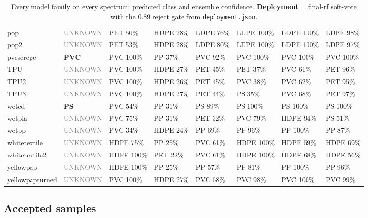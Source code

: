 \documentclass[11pt,a4paper]{article}
\newcommand{\unk}{\textcolor{gray}{UNKNOWN}}
\begin{document}
\begin{table}[p]
\begin{tabular}{llllllll}
pop               & \unk & PET 50\%  & HDPE 28\%& LDPE 76\%& LDPE 100\%& LDPE 100\%& LDPE 98\% \\
pop2              & \unk & PET 53\%  & HDPE 28\%& LDPE 80\%& LDPE 100\%& LDPE 100\%& LDPE 97\% \\
pvcscrepe         & \textbf{PVC} & PVC 100\% & PP 37\% & PVC 92\% & PVC 100\% & PVC 100\% & PVC 100\% \\
TPU               & \unk & PVC 100\% & HDPE 27\%& PET 45\% & PET 37\%  & PVC 61\%  & PET 96\% \\
TPU2              & \unk & PVC 100\% & HDPE 26\%& PET 45\% & PVC 38\%  & PVC 62\%  & PET 95\% \\
TPU3              & \unk & PVC 100\% & HDPE 27\%& PET 44\% & PS 35\%   & PVC 68\%  & PET 97\% \\
wetcd             & \textbf{PS} & PVC 54\% & PP 31\% & PS 89\% & PS 100\% & PS 100\% & PS 100\% \\
wetpla            & \unk & PVC 75\%  & PP 31\%  & PET 32\% & PVC 79\%  & HDPE 94\% & PS 51\% \\
wetpp             & \unk & PVC 34\%  & HDPE 24\%& PP 69\%  & PP 96\%   & PP 100\%  & PP 87\% \\
whitetextile      & \unk & HDPE 75\% & PP 25\%  & PVC 61\% & HDPE 100\%& HDPE 59\% & HDPE 69\% \\
whitetextile2     & \unk & HDPE 100\%& PET 22\% & PVC 61\% & HDPE 100\%& HDPE 68\% & HDPE 56\% \\
yellowpap         & \unk & HDPE 100\%& PP 25\%  & PP 57\%  & PP 81\%   & PP 100\%  & PP 96\% \\
yellowpapturned   & \unk & PVC 100\% & HDPE 27\%& PVC 58\% & PVC 98\%  & PVC 100\% & PVC 99\% \\
\bottomrule
\end{tabular}
\caption{Every model family on every spectrum: predicted class and ensemble
confidence. \textbf{Deployment} = final-rf soft-vote with the 0.89 reject
gate from \texttt{deployment.json}.}
\label{tab:preds}
\end{table}

\subsection{Accepted samples}
\end{document}

